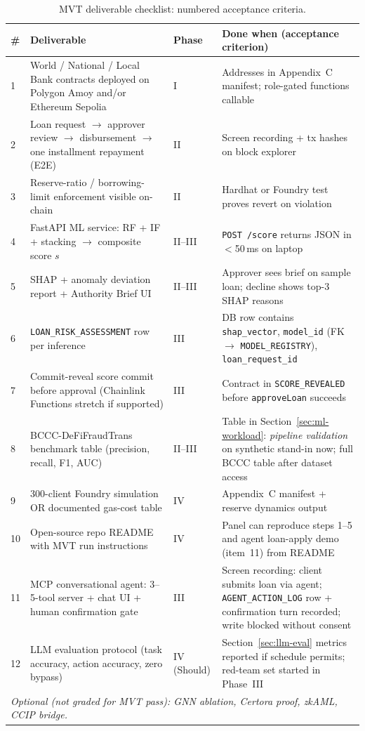 \documentclass[12pt,a4paper]{report}
\newcommand{\tableheadcolor}{\rowcolor{TableHeadBg}}
\begin{document}
\begin{table}[H]
\centering
\caption[MVT deliverable checklist]{MVT deliverable checklist: numbered acceptance criteria.}
\label{tab:mvt-checklist}
\begin{tabular}{p{0.5cm}p{4.8cm}p{1.6cm}p{6.3cm}}
\toprule
\tableheadcolor
\textbf{\#} & \textbf{Deliverable} & \textbf{Phase} & \textbf{Done when (acceptance criterion)} \\
\midrule
1 & World / National / Local Bank contracts deployed on Polygon Amoy and/or Ethereum Sepolia & I & Addresses in Appendix~C manifest; role-gated functions callable \\
2 & Loan request $\to$ approver review $\to$ disbursement $\to$ one installment repayment (E2E) & II & Screen recording + tx hashes on block explorer \\
3 & Reserve-ratio / borrowing-limit enforcement visible on-chain & II & Hardhat or Foundry test proves revert on violation \\
4 & FastAPI ML service: RF + IF + stacking $\to$ composite score $s$ & II--III & \texttt{POST /score} returns JSON in $<$50\,ms on laptop \\
5 & SHAP + anomaly deviation report + Authority Brief UI & II--III & Approver sees brief on sample loan; decline shows top-3 SHAP reasons \\
6 & \texttt{LOAN\_RISK\_ASSESSMENT} row per inference & III & DB row contains \texttt{shap\_vector}, \texttt{model\_id} (FK $\to$ \texttt{MODEL\_REGISTRY}), \texttt{loan\_request\_id} \\
7 & Commit-reveal score commit before approval (Chainlink Functions stretch if supported) & III & Contract in \texttt{SCORE\_REVEALED} before \texttt{approveLoan} succeeds \\
8 & BCCC-DeFiFraudTrans benchmark table (precision, recall, F1, AUC) & II--III & Table in Section~\ref{sec:ml-workload}: \textit{pipeline validation} on synthetic stand-in now; full BCCC table after dataset access \\
9 & 300-client Foundry simulation OR documented gas-cost table & IV & Appendix~C manifest + reserve dynamics output \\
10 & Open-source repo README with MVT run instructions & IV & Panel can reproduce steps 1--5 and agent loan-apply demo (item~11) from README \\
11 & MCP conversational agent: 3--5-tool server + chat UI + human confirmation gate & III & Screen recording: client submits loan via agent; \texttt{AGENT\_ACTION\_LOG} row + confirmation turn recorded; write blocked without consent \\
12 & LLM evaluation protocol (task accuracy, action accuracy, zero bypass) & IV (Should) & Section~\ref{sec:llm-eval} metrics reported if schedule permits; red-team set started in Phase~III \\
\multicolumn{4}{l}{\textit{Optional (not graded for MVT pass): GNN ablation, Certora proof, zkAML, CCIP bridge.}} \\
\bottomrule
\end{tabular}
\end{table}
\end{document}
